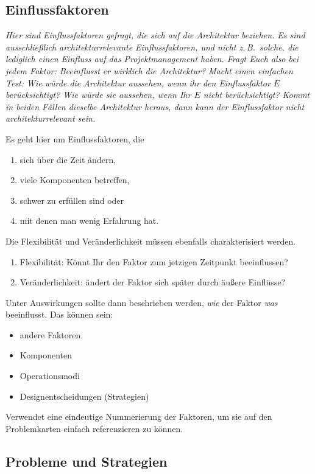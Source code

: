\documentclass[fontsize=12pt,paper=a4,twoside]{scrartcl}
\begin{document}
\subsection{Einflussfaktoren} \label{sec:einflussfaktoren}
{\itshape Hier sind Einflussfaktoren gefragt, die sich auf die Architektur
beziehen. Es sind ausschließlich architekturrelevante Einflussfaktoren, und 
nicht z.\,B.\ solche, die lediglich einen Einfluss auf das Projektmanagement 
haben. Fragt Euch also bei jedem Faktor: Beeinflusst er wirklich die 
Architektur? Macht einen einfachen Test: Wie würde die Architektur aussehen, 
wenn ihr den Einflussfaktor $E$ berücksichtigt? Wie würde sie aussehen, wenn Ihr
$E$ nicht berücksichtigt? Kommt in beiden Fällen dieselbe Architektur heraus, 
dann kann der Einflussfaktor nicht architekturrelevant sein.

Es geht hier um Einflussfaktoren, die
\begin{enumerate}
  \item sich über die Zeit ändern,
  \item viele Komponenten betreffen,
  \item schwer zu erfüllen sind oder
  \item mit denen man wenig Erfahrung hat.
\end{enumerate}

Die Flexibilität und Veränderlichkeit müssen ebenfalls charakterisiert werden. 
\begin{enumerate}
  \item Flexibilität: Könnt Ihr den Faktor zum jetzigen Zeitpunkt beeinflussen?
  \item Veränderlichkeit: ändert der Faktor sich später durch äußere Einflüsse?
\end{enumerate}

Unter Auswirkungen sollte dann beschrieben werden, \emph{wie} der Faktor 
\emph{was} beeinflusst. Das können sein:
\begin{itemize}
  \item andere Faktoren
  \item Komponenten
  \item Operationsmodi
  \item Designentscheidungen (Strategien)
\end{itemize}

Verwendet eine eindeutige Nummerierung der Faktoren, um sie auf den 
Problemkarten einfach referenzieren zu können.}

\subsection{Probleme und Strategien} \label{sec:strategien}
\end{document}

